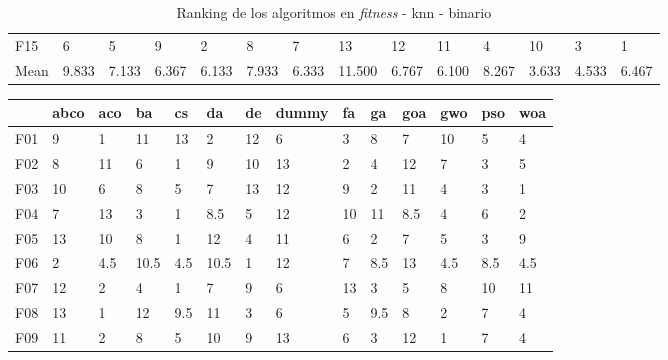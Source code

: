 \begin{table}
\begin{adjustbox}{width=\linewidth}
\begin{tabular}{llllllllllllll}
            F15  & 6     & 5     & 9     & 2     & 8     & 7     & 13     & 12    & 11    & 4     & 10    & 3     & 1     \\
            Mean & 9.833 & 7.133 & 6.367 & 6.133 & 7.933 & 6.333 & 11.500 & 6.767 & 6.100 & 8.267 & 3.633 & 4.533 & 6.467 \\
            \bottomrule
        \end{tabular}
    \end{adjustbox}
    \caption{Ranking de los algoritmos en \textit{fitness} - knn - binario}
    \label{tab:ranking_fitness_bin_knn}
\end{table}

\begin{table}
    \begin{adjustbox}{width=\linewidth}
        \begin{tabular}{llllllllllllll}
            \toprule
            {}   & abco  & aco   & ba    & cs    & da    & de    & dummy  & fa    & ga    & goa   & gwo   & pso   & woa   \\
            \midrule
            F01  & 9     & 1     & 11    & 13    & 2     & 12    & 6      & 3     & 8     & 7     & 10    & 5     & 4     \\
            F02  & 8     & 11    & 6     & 1     & 9     & 10    & 13     & 2     & 4     & 12    & 7     & 3     & 5     \\
            F03  & 10    & 6     & 8     & 5     & 7     & 13    & 12     & 9     & 2     & 11    & 4     & 3     & 1     \\
            F04  & 7     & 13    & 3     & 1     & 8.5   & 5     & 12     & 10    & 11    & 8.5   & 4     & 6     & 2     \\
            F05  & 13    & 10    & 8     & 1     & 12    & 4     & 11     & 6     & 2     & 7     & 5     & 3     & 9     \\
            F06  & 2     & 4.5   & 10.5  & 4.5   & 10.5  & 1     & 12     & 7     & 8.5   & 13    & 4.5   & 8.5   & 4.5   \\
            F07  & 12    & 2     & 4     & 1     & 7     & 9     & 6      & 13    & 3     & 5     & 8     & 10    & 11    \\
            F08  & 13    & 1     & 12    & 9.5   & 11    & 3     & 6      & 5     & 9.5   & 8     & 2     & 7     & 4     \\
            F09  & 11    & 2     & 8     & 5     & 10    & 9     & 13     & 6     & 3     & 12    & 1     & 7     & 4     \\

\end{tabular}
\end{adjustbox}
\end{table}
